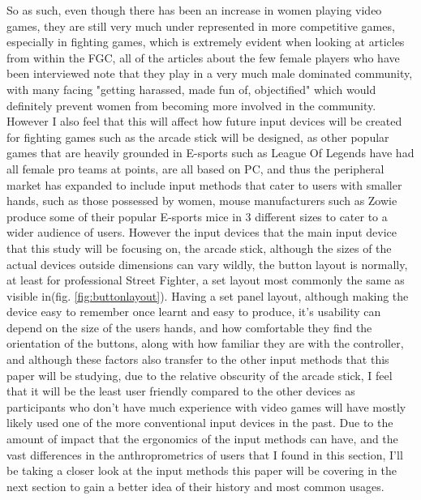 \documentclass[journal]{IEEEtran}
\begin{document}
So as such, even though there has been an increase in women playing video games, they are still very much under represented in more competitive games, especially in fighting games, which is extremely evident when looking at articles from within the FGC, all of the articles about the few female players who have been interviewed note that they play in a very much male dominated community\cite{sooa}, with many facing "getting harassed, made fun of, objectified"\cite{comboqueens} which would definitely prevent women from becoming more involved in the community. However I also feel that this will affect how future input devices will be created for fighting games such as the arcade stick will be designed, as other popular games that are heavily grounded in E-sports such as League Of Legends have had all female pro teams at points\cite{femalelol}, are all based on PC, and thus the peripheral market has expanded to include input methods that cater to users with smaller hands, such as those possessed by women, mouse manufacturers such as Zowie produce some of their popular E-sports mice in 3 different sizes\cite{zowiemouse} to cater to a wider audience of users. However the input devices that the main input device that this study will be focusing on, the arcade stick, although the sizes of the actual devices outside dimensions can vary wildly, the button layout is normally, at least for professional Street Fighter, a set layout most commonly the same as visible in(fig. \ref{fig:buttonlayout}). Having a set panel layout, although making the device easy to remember once learnt and easy to produce, it's usability can depend on the size of the users hands, and how comfortable they find the orientation of the buttons, along with how familiar they are with the controller, and although these factors also transfer to the other input methods that this paper will be studying, due to the relative obscurity of the arcade stick, I feel that it will be the least user friendly compared to the other devices as participants who don't have much experience with video games will have mostly likely used one of the more conventional input devices in the past. Due to the amount of impact that the ergonomics of the input methods can have, and the vast differences in the anthroprometrics of users that I found in this section, I'll be taking a closer look at the input methods this paper will be covering in the next section to gain a better idea of their history and most common usages.   
\end{document}
